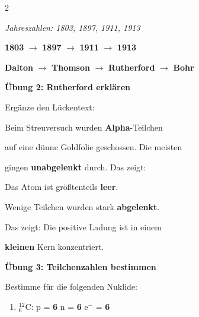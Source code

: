 \documentclass[10pt, a4paper]{article}
\newcommand{\fachfarbe}{physik}
\newcommand{\lsg}[1]{\textcolor{loesung}{\textbf{#1}}}
\newcommand{\abschnitt}[1]{%
    \vspace{8pt}
    \noindent\textbf{\textcolor{\fachfarbe}{#1}}
    \vspace{4pt}
}
\begin{document}
\begin{multicols}{2}
\vspace{4pt}

\textit{Jahreszahlen: 1803, 1897, 1911, 1913}

\vspace{6pt}

\begin{center}
\lsg{1803} $\rightarrow$ \lsg{1897} $\rightarrow$ \lsg{1911} $\rightarrow$ \lsg{1913}

\vspace{4pt}

\lsg{Dalton} $\rightarrow$ \lsg{Thomson} $\rightarrow$ \lsg{Rutherford} $\rightarrow$ \lsg{Bohr}
\end{center}

\vspace{6pt}


\abschnitt{Übung 2: Rutherford erklären}

Ergänze den Lückentext:

\vspace{4pt}

Beim Streuversuch wurden \lsg{Alpha}-Teilchen

auf eine dünne Goldfolie geschossen. Die meisten

gingen \lsg{unabgelenkt} durch. Das zeigt:

Das Atom ist größtenteils \lsg{leer}.

Wenige Teilchen wurden stark \lsg{abgelenkt}.

Das zeigt: Die positive Ladung ist in einem

\lsg{kleinen} Kern konzentriert.

\vspace{8pt}


\abschnitt{Übung 3: Teilchenzahlen bestimmen}

Bestimme für die folgenden Nuklide:

\vspace{6pt}

\begin{enumerate}[leftmargin=2em]
\item $^{12}_{6}$C: \quad p = \lsg{6} \quad n = \lsg{6} \quad e$^-$ = \lsg{6}


\end{enumerate}
\end{multicols}
\end{document}
